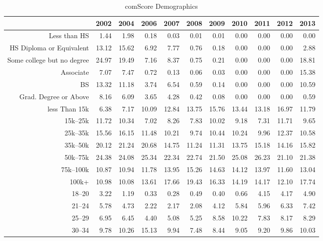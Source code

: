 \begin{table}[!htb]
\centering
\caption{comScore Demographics} 
\label{tab:cs_dem}
\begingroup\tiny
\begin{tabular}{rrrrrrrrrrr}
  \hline
 & 2002 & 2004 & 2006 & 2007 & 2008 & 2009 & 2010 & 2011 & 2012 & 2013 \\ 
  \hline
Less than HS & 1.44 & 1.98 & 0.18 & 0.03 & 0.01 & 0.01 & 0.00 & 0.00 & 0.00 & 0.00 \\ 
  HS Diploma or Equivalent & 13.12 & 15.62 & 6.92 & 7.77 & 0.76 & 0.18 & 0.00 & 0.00 & 0.00 & 2.88 \\ 
  Some college but no degree & 24.97 & 19.49 & 7.16 & 8.37 & 0.75 & 0.21 & 0.00 & 0.00 & 0.00 & 18.81 \\ 
  Associate & 7.07 & 7.47 & 0.72 & 0.13 & 0.06 & 0.03 & 0.00 & 0.00 & 0.00 & 15.38 \\ 
  BS & 13.32 & 11.18 & 3.74 & 6.54 & 0.59 & 0.14 & 0.00 & 0.00 & 0.00 & 10.59 \\ 
  Grad. Degree or Above & 8.16 & 6.09 & 3.65 & 4.28 & 0.42 & 0.08 & 0.00 & 0.00 & 0.00 & 0.59 \\ 
  less Than 15k & 6.38 & 7.17 & 10.09 & 12.84 & 13.75 & 15.76 & 13.44 & 13.18 & 16.97 & 11.79 \\ 
  15k--25k & 11.72 & 10.34 & 7.02 & 8.26 & 7.83 & 10.02 & 9.18 & 7.31 & 11.71 & 9.65 \\ 
  25k--35k & 15.56 & 16.15 & 11.48 & 10.21 & 9.74 & 10.44 & 10.24 & 9.96 & 12.37 & 10.58 \\ 
  35k--50k & 20.12 & 21.24 & 20.68 & 14.75 & 11.24 & 11.31 & 13.75 & 15.18 & 14.16 & 15.82 \\ 
  50k--75k & 24.38 & 24.08 & 25.34 & 22.34 & 22.74 & 21.50 & 25.08 & 26.23 & 21.10 & 21.38 \\ 
  75k--100k & 10.87 & 10.94 & 11.78 & 13.95 & 15.26 & 14.63 & 14.12 & 13.97 & 11.60 & 13.04 \\ 
  100k+ & 10.98 & 10.08 & 13.61 & 17.66 & 19.43 & 16.33 & 14.19 & 14.17 & 12.10 & 17.74 \\ 
  18--20 & 3.22 & 1.19 & 0.33 & 0.28 & 0.49 & 0.40 & 0.66 & 4.15 & 4.17 & 4.90 \\ 
  21--24 & 5.78 & 4.73 & 2.22 & 2.17 & 2.08 & 4.12 & 5.84 & 5.96 & 6.33 & 7.42 \\ 
  25--29 & 6.95 & 6.45 & 4.40 & 5.08 & 5.25 & 8.58 & 10.22 & 7.83 & 8.17 & 8.29 \\ 
  30--34 & 9.78 & 10.26 & 15.13 & 9.94 & 7.48 & 8.44 & 9.05 & 9.20 & 9.86 & 10.03 \\ 

\end{tabular}
\end{table}
